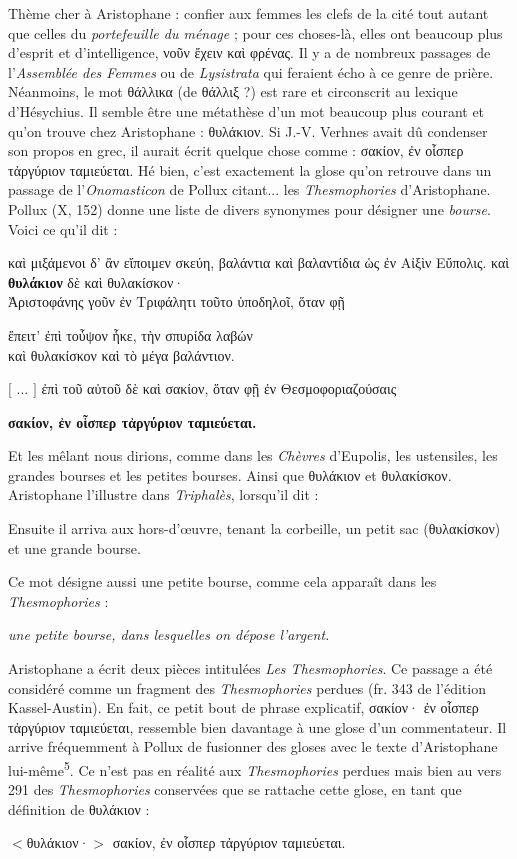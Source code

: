\documentclass[12pt]{book}%
\newcommand{\italique}[1]{\textit{#1}}%
\newcommand{\citComm}[1]{\begin{quoting}[vskip=0pt] #1 \end{quoting}}%
\newcommand{\marqueur}[1]{\textsuperscript{#1}}%
\newenvironment{groupe}{%
\pstart%
\ledgroup%
}{%
\pend %
}%
\begin{document}
\begin{pages}
\begin{Leftside}
\begin{groupe}
{{Thème cher à Aristophane : confier aux femmes les clefs de la cité tout autant que celles du \italique{portefeuille du ménage} ; pour ces choses-là, elles ont beaucoup plus d'esprit et d'intelligence, νοῦν ἔχειν καὶ φρένας. Il y a de nombreux passages de l'\italique{Assemblée des Femmes} ou de \italique{Lysistrata} qui feraient écho à ce genre de prière.
Néanmoins, le mot θάλλικα (de θάλλιξ ?) est rare et circonscrit au lexique d'Hésychius. Il semble être une métathèse d'un mot beaucoup plus courant et qu'on trouve chez Aristophane : θυλάκιον. 
Si J.-V. Verhnes avait dû condenser son propos en grec, il aurait écrit quelque chose comme : σακίον, ἐν οἷσπερ τἀργύριον ταμιεύεται. Hé bien, c'est exactement la glose qu'on retrouve dans un passage de l'\italique{Onomasticon} de Pollux citant... les \italique{Thesmophories} d'Aristophane.
Pollux (X, 152) donne une liste de divers synonymes pour désigner une \italique{bourse}. Voici ce qu'il dit :%
\citComm{καὶ μιξάμενοι δ’ ἂν εἴποιμεν σκεύη, βαλάντια καὶ βαλαντίδια ὡς ἐν Αἰξὶν Εὔπολις. καὶ \textbf{θυλάκιον} δὲ καὶ θυλακίσκον·\\
Ἀριστοφάνης γοῦν ἐν Τριφάλητι τοῦτο ὑποδηλοῖ, ὅταν φῇ
\citComm{ἔπειτ' ἐπὶ τοὖψον ἧκε, τὴν σπυρίδα λαβών\\
καὶ θυλακίσκον καὶ τὸ μέγα βαλάντιον. }
$[$ ... $]$
ἐπὶ τοῦ αὐτοῦ δὲ καὶ σακίον, ὅταν φῇ ἐν Θεσμοφοριαζούσαις 
\citComm{\textbf{σακίον, ἐν οἷσπερ τἀργύριον ταμιεύεται.}}
Et les mêlant nous dirions, comme dans les \italique{Chèvres} d'Eupolis, les ustensiles, les grandes bourses et les petites bourses. Ainsi que θυλάκιον et θυλακίσκον. Aristophane l'illustre dans \italique{Triphalès}, lorsqu'il dit :
\citComm{Ensuite il arriva aux hors-d'œuvre, tenant la corbeille, un petit sac (θυλακίσκον) et une grande bourse.}
Ce mot désigne aussi une petite bourse, comme cela apparaît dans les \italique{Thesmophories} :
\citComm{\italique{une petite bourse, dans lesquelles on dépose l'argent.}}}%
Aristophane a écrit deux pièces intitulées \italique{Les Thesmophories}. Ce passage a été considéré comme un fragment des \italique{Thesmophories} perdues (fr. 343 de l'édition Kassel-Austin). En fait, ce petit bout de phrase explicatif, σακίον· ἐν οἷσπερ τἀργύριον ταμιεύεται, ressemble bien davantage à une glose d'un commentateur. Il arrive fréquemment à Pollux de fusionner des gloses avec le texte d'Aristophane lui-même\marqueur{5}. Ce n'est pas en réalité aux \italique{Thesmophories} perdues mais bien au vers 291 des \italique{Thesmophories} conservées que se rattache cette glose, en tant que définition de θυλάκιον :%
\citComm{$<$θυλάκιον·$>$ σακίον, ἐν οἷσπερ τἀργύριον ταμιεύεται.}%
}}
\end{groupe}
\end{Leftside}
\end{pages}
\end{document}
